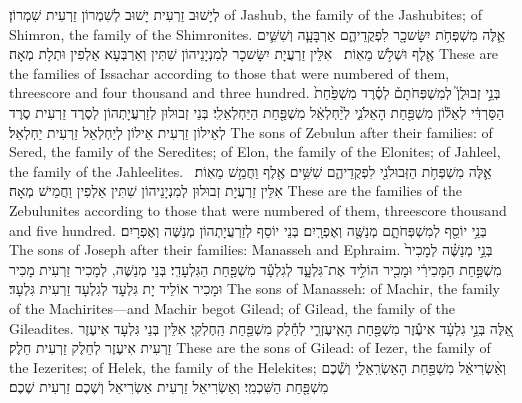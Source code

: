 {לְיָשׁוּב זַרְעִית יָשׁוּב לְשִׁמְרוֹן זַרְעִית שִׁמְרוֹן׃}
{of Jashub, the family of the Jashubites; of Shimron, the family of the Shimronites.}{}
{אֵ֛לֶּה מִשְׁפְּחֹ֥ת יִשָּׂשכָ֖ר לִפְקֻדֵיהֶ֑ם אַרְבָּעָ֧ה וְשִׁשִּׁ֛ים אֶ֖לֶף וּשְׁלֹ֥שׁ מֵאֽוֹת׃ \setuma }
{אִלֵּין זַרְעֲיָת יִשָּׂשכָר לְמִנְיָנֵיהוֹן שִׁתִּין וְאַרְבְּעָא אַלְפִין וּתְלָת מְאָה׃}
{These are the families of Issachar according to those that were numbered of them, threescore and four thousand and three hundred.}{}
{בְּנֵ֣י זְבוּלֻן֮ לְמִשְׁפְּחֹתָם֒ לְסֶ֗רֶד מִשְׁפַּ֙חַת֙ הַסַּרְדִּ֔י לְאֵל֕וֹן מִשְׁפַּ֖חַת הָאֵלֹנִ֑י לְיַ֨חְלְאֵ֔ל מִשְׁפַּ֖חַת הַיַּחְלְאֵלִֽי׃}
{בְּנֵי זְבוּלוּן לְזַרְעֲיָתְהוֹן לְסֶרֶד זַרְעִית סֶרֶד לְאֵילוֹן זַרְעִית אֵילוֹן לְיַחְלְאֵל זַרְעִית יַחְלְאֵל׃}
{The sons of Zebulun after their families: of Sered, the family of the Seredites; of Elon, the family of the Elonites; of Jahleel, the family of the Jahleelites.}{}
{אֵ֛לֶּה מִשְׁפְּחֹ֥ת הַזְּבוּלֹנִ֖י לִפְקֻדֵיהֶ֑ם שִׁשִּׁ֥ים אֶ֖לֶף וַחֲמֵ֥שׁ מֵאֽוֹת׃ \setuma }
{אִלֵּין זַרְעֲיָת זְבוּלוּן לְמִנְיָנֵיהוֹן שִׁתִּין אַלְפִין וַחֲמֵישׁ מְאָה׃}
{These are the families of the Zebulunites according to those that were numbered of them, threescore thousand and five hundred.}{}
{בְּנֵ֥י יוֹסֵ֖ף לְמִשְׁפְּחֹתָ֑ם מְנַשֶּׁ֖ה וְאֶפְרָֽיִם׃}
{בְּנֵי יוֹסֵף לְזַרְעֲיָתְהוֹן מְנַשֶּׁה וְאֶפְרָיִם׃}
{The sons of Joseph after their families: Manasseh and Ephraim.}{}
{בְּנֵ֣י מְנַשֶּׁ֗ה לְמָכִיר֙ מִשְׁפַּ֣חַת הַמָּכִירִ֔י וּמָכִ֖יר הוֹלִ֣יד אֶת־גִּלְעָ֑ד לְגִלְעָ֕ד מִשְׁפַּ֖חַת הַגִּלְעָדִֽי׃}
{ בְּנֵי מְנַשֶּׁה, לְמָכִיר זַרְעִית מָכִיר וּמָכִיר אוֹלֵיד יָת גִּלְעָד לְגִלְעָד זַרְעִית גִּלְעָד׃}
{The sons of Manasseh: of Machir, the family of the Machirites—and Machir begot Gilead; of Gilead, the family of the Gileadites.}{}
{אֵ֚לֶּה בְּנֵ֣י גִלְעָ֔ד אִיעֶ֕זֶר מִשְׁפַּ֖חַת הָאִֽיעֶזְרִ֑י לְחֵ֕לֶק מִשְׁפַּ֖חַת הַֽחֶלְקִֽי׃}
{אִלֵּין בְּנֵי גִּלְעָד אִיעֶזֶר זַרְעִית אִיעֶזֶר לְחֵלֶק זַרְעִית חֵלֶק׃}
{These are the sons of Gilead: of Iezer, the family of the Iezerites; of Helek, the family of the Helekites;}{}
{וְאַ֨שְׂרִיאֵ֔ל מִשְׁפַּ֖חַת הָאַשְׂרִֽאֵלִ֑י וְשֶׁ֕כֶם מִשְׁפַּ֖חַת הַשִּׁכְמִֽי׃}
{וְאַשְׂרִיאֵל זַרְעִית אַשְׂרִיאֵל וְשֶׁכֶם זַרְעִית שֶׁכֶם׃}
